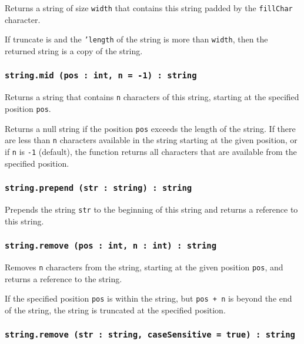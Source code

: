 Returns a string of size \texttt{width} that contains this string padded by the \texttt{fillChar} character.

If truncate is \false{} and the \texttt{'length} of the string is more than \texttt{width}, then the returned string is a copy of the string.

\subsubsection{\texttt{string.mid (pos : int, n = -1) : string}}

Returns a string that contains \texttt{n} characters of this string, starting at the specified position \texttt{pos}.

Returns a null string if the position \texttt{pos} exceeds the length of the string. If there are less than \texttt{n} characters available in the string starting at the given position, or if \texttt{n} is \texttt{-1} (default), the function returns all characters that are available from the specified position.

\subsubsection{\texttt{string.prepend (str : string) : string}}

Prepends the string \texttt{str} to the beginning of this string and returns a reference to this string.

\subsubsection{\texttt{string.remove (pos : int, n : int) : string}}

Removes \texttt{n} characters from the string, starting at the given position \texttt{pos}, and returns a reference to the string.

If the specified position \texttt{pos} is within the string, but \texttt{pos + n} is beyond the end of the string, the string is truncated at the specified position.

\subsubsection{\texttt{string.remove (str : string, caseSensitive = true) : string}}

